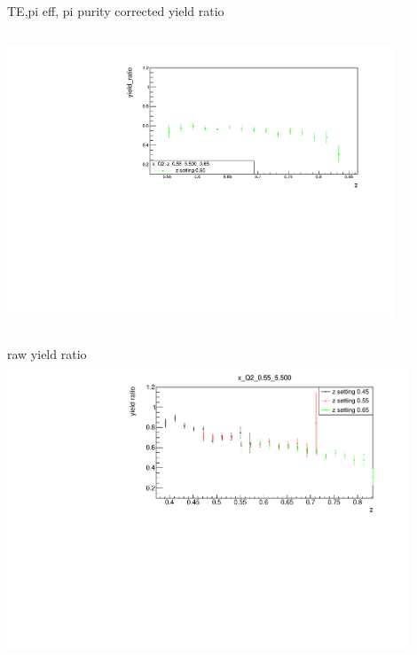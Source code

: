 \begin{frame}{TE,pi eff, pi purity corrected yield ratio}
\begin{columns}
\begin{column}[T]{0.5\textwidth}
\includegraphics[width = 0.9\textwidth]{results/yield/statistics_corr/x_Q2_z_0.55_5.500_0.65_ratio.pdf}
\end{column}
\begin{column}[T]{0.5\textwidth}
\end{column}
\end{columns}
\end{frame}
\begin{frame}{raw yield ratio}
\includegraphics[width = 0.9\textwidth]{results/yield/statistics/x_Q2_0.55_5.500_ratio.pdf}
\end{frame}
